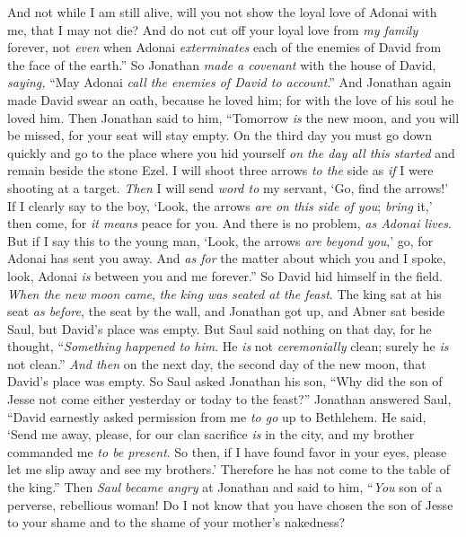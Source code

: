 \begin{biblechapter}
\verse And not while I am still alive, will you not show the loyal love of Adonai with me, that I may not die?
\verse And do not cut off your loyal love from \textit{my family} forever, not \textit{even} when Adonai \textit{exterminates} each of the enemies of David from the face of the earth.”
\verse So Jonathan \textit{made a covenant} with the house of David, \textit{saying,} “May Adonai \textit{call the enemies of David to account}.”
\verse And Jonathan again made David swear an oath, because he loved him; for with the love of his soul he loved him.
\verse Then Jonathan said to him, “Tomorrow \textit{is} the new moon, and you will be missed, for your seat will stay empty.
\verse On the third day you must go down quickly and go to the place where you hid yourself \textit{on the day all this started} and remain beside the stone Ezel.
\verse I will shoot three arrows \textit{to the} side as \textit{if} I were shooting at a target.
\verse \textit{Then} I will send \textit{word to} my servant, ‘Go, find the arrows!’ If I clearly say to the boy, ‘Look, the arrows \textit{are} \textit{on this side of you}; \textit{bring} it,’ then come, for \textit{it means} peace for you. And there is no problem, \textit{as Adonai lives}.
\verse But if I say this to the young man, ‘Look, the arrows \textit{are} \textit{beyond you},’ go, for Adonai has sent you away.
\verse And \textit{as for} the matter about which you and I spoke, look, Adonai \textit{is} between you and me forever.”
\verse So David hid himself in the field. \textit{When the new moon came}, \textit{the king was seated at the feast}.
\verse The king sat at his seat \textit{as before}, the seat by the wall, and Jonathan got up, and Abner sat beside Saul, but David’s place was empty.
\verse But Saul said nothing on that day, for he thought, “\textit{Something happened to him}. He \textit{is} not \textit{ceremonially} clean; surely he \textit{is} not clean.”
\verse \textit{And then} on the next day, the second day of the new moon, that David’s place was empty. So Saul asked Jonathan his son, “Why did the son of Jesse not come either yesterday or today to the feast?”
\verse Jonathan answered Saul, “David earnestly asked permission from me \textit{to go} up to Bethlehem.
\verse He said, ‘Send me away, please, for our clan sacrifice \textit{is} in the city, and my brother commanded me \textit{to be present}. So then, if I have found favor in your eyes, please let me slip away and see my brothers.’ Therefore he has not come to the table of the king.”
\verse Then \textit{Saul became angry} at Jonathan and said to him, “\textit{You} son of a perverse, rebellious woman! Do I not know that you have chosen the son of Jesse to your shame and to the shame of your mother’s nakedness?

\end{biblechapter}
